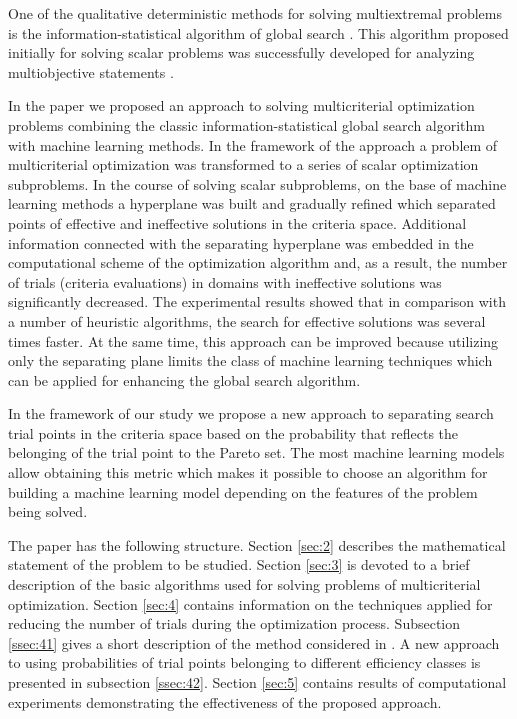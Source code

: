 \documentclass[runningheads]{llncs}
\begin{document}
One of the qualitative deterministic methods for solving multiextremal problems is the  information-statistical algorithm of global search \cite{Strongin2000,Sergeyev2013}. This algorithm proposed initially for solving scalar problems was successfully developed for analyzing multiobjective statements \cite{ML_MCO_2023,Gergel2018,GergelKozinov2020}.

In the paper \cite{ML_MCO_2023} we proposed an approach to solving multicriterial optimization problems combining the classic information-statistical global search algorithm with machine learning methods. In the framework of the approach a problem of multicriterial optimization was transformed to a series of scalar optimization subproblems. In the course of solving scalar subproblems, on the base of machine learning methods a hyperplane was built and gradually refined which separated points of effective and ineffective solutions in the criteria space. Additional information connected with the separating hyperplane was embedded in the computational scheme of the optimization algorithm and, as a result, the number of trials (criteria evaluations) in domains with ineffective solutions was significantly decreased. The experimental results showed that in comparison with a number of heuristic algorithms, the search for effective solutions was several times faster. At the same time, this approach can be improved because utilizing only the separating plane limits the class of machine learning techniques which can be applied for enhancing the global search algorithm.

In the framework of our study we propose a new approach to separating search trial points in the criteria space based on the probability that reflects the belonging of the trial point to the Pareto set. The most machine learning models allow obtaining this metric which makes it possible to choose an algorithm for building a machine learning model depending on the features of the problem being solved.

The paper has the following structure. Section \ref{sec:2} describes the mathematical statement of the problem to be studied. Section \ref{sec:3} is devoted to a brief description of the basic algorithms used for solving problems of multicriterial optimization. Section \ref{sec:4} contains information on the techniques applied for reducing the number of trials during the optimization process. Subsection \ref{ssec:41} gives a short description of the method considered in \cite{ML_MCO_2023}. A new approach to using probabilities of trial points belonging to different efficiency classes is presented in subsection \ref{ssec:42}. Section \ref{sec:5} contains results of computational experiments demonstrating the effectiveness of the proposed approach.
\end{document}
